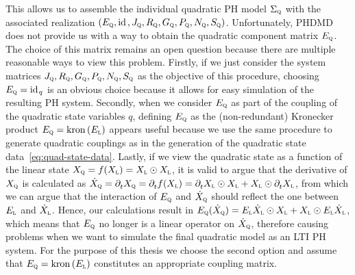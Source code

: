 This allows us to assemble the individual quadratic \ac{PH} model $\Sigma_\msc{q}$ with the associated realization $(E_\msc{q}, \id, J_\msc{q}, R_\msc{q}, G_\msc{q}, P_\msc{q}, N_\msc{q}, S_\msc{q})$.
Unfortunately, \ac{PHDMD} does not provide us with a way to obtain the quadratic component matrix $E_\msc{q}$.
The choice of this matrix remains an open question because there are multiple reasonable ways to view this problem.
Firstly, if we just consider the system matrices $J_\msc{q}, R_\msc{q}, G_\msc{q}, P_\msc{q}, N_\msc{q}, S_\msc{q}$ as the objective of this procedure, choosing $E_\msc{q} = \id[q]$ is an obvious choice because it allows for easy simulation of the resulting \ac{PH} system.
Secondly, when we consider $E_\msc{q}$ as part of the coupling of the quadratic state variables $q$, defining $E_\msc{q}$ as the (non-redundant) Kronecker product $E_\msc{q} = \kron{E_\msc{l}}$ appears useful because we use the same procedure to generate quadratic couplings as in the generation of the quadratic state data~\eqref{eq:quad-state-data}.
Lastly, if we view the quadratic state as a function of the linear state $X_\msc{q} = f(X_\msc{l}) = X_\msc{l} \odot X_\msc{l}$, it is valid to argue that the derivative of $X_\msc{q}$ is calculated as $\dot{X}_\msc{q} = \pd[t]{} X_\msc{q}= \pd[t]{} f(X_\msc{l}) = \pd[t]{} X_\msc{l} \odot X_\msc{l} + X_\msc{l} \odot \pd[t]{} X_\msc{l}$, from which we can argue that the interaction of $E_\msc{q}$ and $\dot{X}_\msc{q}$ should reflect the one between $E_\msc{l}$ and $\dot{X}_\msc{l}$.
Hence, our calculations result in $E_\msc{q} (\dot{X}_\msc{q}) = E_\msc{l} \dot{X}_\msc{l} \odot X_\msc{l} + X_\msc{l} \odot E_\msc{l} \dot{X}_\msc{l}$, which means that $E_\msc{q}$ no longer is a linear operator on $\dot{X}_\msc{q}$, therefore causing problems when we want to simulate the final quadratic model as an \ac{LTI} \ac{PH} system.
For the purpose of this thesis we choose the second option and assume that $E_\msc{q} = \kron{E_\msc{l}}$ constitutes an appropriate coupling matrix.

